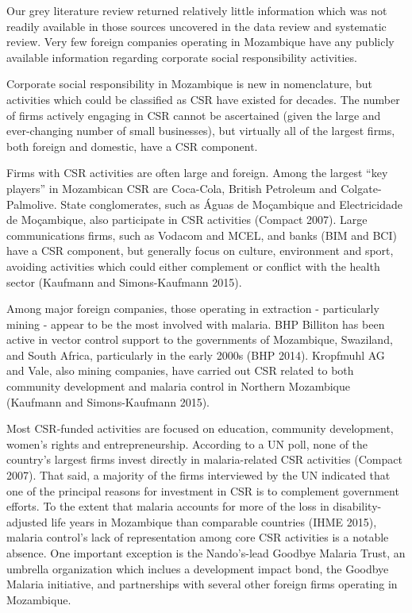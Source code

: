 \documentclass[]{article}
\begin{document}
Our grey literature review returned relatively little information which
was not readily available in those sources uncovered in the data review
and systematic review. Very few foreign companies operating in
Mozambique have any publicly available information regarding corporate
social responsibility activities.

Corporate social responsibility in Mozambique is new in nomenclature,
but activities which could be classified as CSR have existed for
decades. The number of firms actively engaging in CSR cannot be
ascertained (given the large and ever-changing number of small
businesses), but virtually all of the largest firms, both foreign and
domestic, have a CSR component.

Firms with CSR activities are often large and foreign. Among the largest
``key players'' in Mozambican CSR are Coca-Cola, British Petroleum and
Colgate-Palmolive. State conglomerates, such as Águas de Moçambique and
Electricidade de Moçambique, also participate in CSR activities (Compact
2007). Large communications firms, such as Vodacom and MCEL, and banks
(BIM and BCI) have a CSR component, but generally focus on culture,
environment and sport, avoiding activities which could either complement
or conflict with the health sector (Kaufmann and Simons-Kaufmann 2015).

Among major foreign companies, those operating in extraction -
particularly mining - appear to be the most involved with malaria. BHP
Billiton has been active in vector control support to the governments of
Mozambique, Swaziland, and South Africa, particularly in the early 2000s
(BHP 2014). Kropfmuhl AG and Vale, also mining companies, have carried
out CSR related to both community development and malaria control in
Northern Mozambique (Kaufmann and Simons-Kaufmann 2015).

Most CSR-funded activities are focused on education, community
development, women's rights and entrepreneurship. According to a UN
poll, none of the country's largest firms invest directly in
malaria-related CSR activities (Compact 2007). That said, a majority of
the firms interviewed by the UN indicated that one of the principal
reasons for investment in CSR is to complement government efforts. To
the extent that malaria accounts for more of the loss in
disability-adjusted life years in Mozambique than comparable countries
(IHME 2015), malaria control's lack of representation among core CSR
activities is a notable absence. One important exception is the
Nando's-lead Goodbye Malaria Trust, an umbrella organization which
inclues a development impact bond, the Goodbye Malaria initiative, and
partnerships with several other foreign firms operating in Mozambique.
\end{document}
